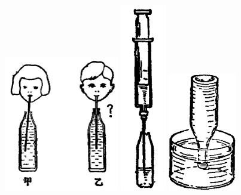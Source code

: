 \begin{figure}[htbp]
    \centering
    \begin{minipage}{6cm}
    \centering
    \vspace{6em}
    \includegraphics[width=5cm]{../pic/czwl1-ch5-42}
    \caption{}\label{fig:5-42}
    \end{minipage}
    \qquad
    \begin{minipage}{3cm}
    \centering
    \includegraphics[width=2cm]{../pic/czwl1-ch5-43}
    \caption{}\label{fig:5-43}
    \end{minipage}
    \qquad
    \begin{minipage}{5cm}
    \centering
    \vspace{8em}
    \includegraphics[width=3cm]{../pic/czwl1-ch5-44}
    \caption{}\label{fig:5-44}
    \end{minipage}
\end{figure}

